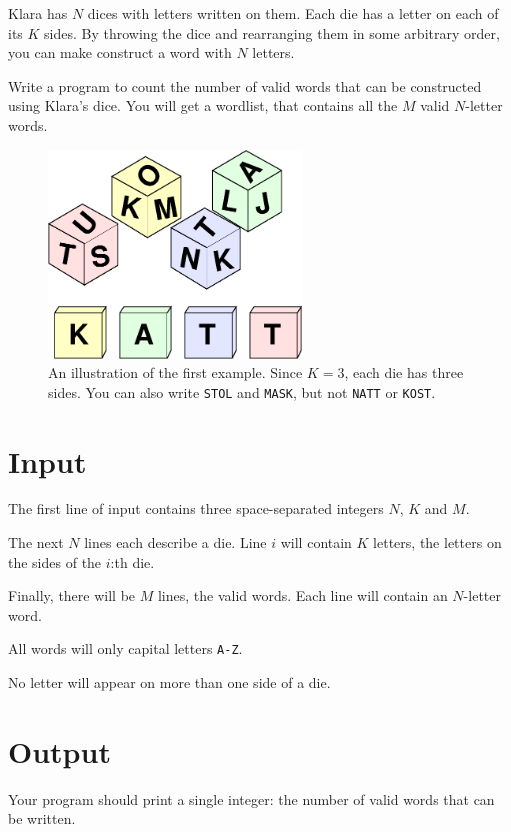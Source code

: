 
Klara has $N$ dices with letters written on them.
Each die has a letter on each of its $K$ sides.
By throwing the dice and rearranging them in some arbitrary order, you can make construct a word with $N$ letters.

Write a program to count the number of valid words that can be constructed using Klara's dice.
You will get a wordlist, that contains all the $M$ valid $N$-letter words.

\begin{figure}[ht!]
\centering
\includegraphics[width=0.6\textwidth]{tarningar.png}
\caption{An illustration of the first example. Since $K = 3$, each die has three sides. You can also write \texttt{STOL} and \texttt{MASK}, but not \texttt{NATT} or \texttt{KOST}.}
\label{overflow}
\end{figure}

\section*{Input}

The first line of input contains three space-separated integers $N$, $K$ and $M$.

The next $N$ lines each describe a die. Line $i$ will contain $K$ letters, the letters on the sides of the $i$:th die.

Finally, there will be $M$ lines, the valid words. Each line will contain an $N$-letter word.

All words will only capital letters \texttt{A-Z}.

No letter will appear on more than one side of a die.

\section*{Output}
Your program should print a single integer: the number of valid words that can be written.


